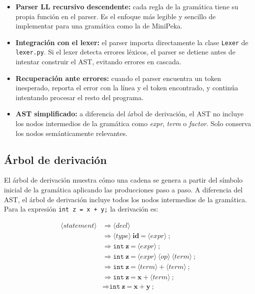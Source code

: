 \documentclass[12pt]{article}
\begin{document}
\begin{itemize}
    \item \textbf{Parser LL recursivo descendente:} cada regla de la
          gramática tiene su propia función en el parser. Es el enfoque
          más legible y sencillo de implementar para una gramática como
          la de MiniPeka.

    \item \textbf{Integración con el lexer:} el parser importa directamente
          la clase \texttt{Lexer} de \texttt{lexer.py}. Si el lexer detecta
          errores léxicos, el parser se detiene antes de intentar construir
          el AST, evitando errores en cascada.

    \item \textbf{Recuperación ante errores:} cuando el parser encuentra
          un token inesperado, reporta el error con la línea y el token
          encontrado, y continúa intentando procesar el resto del programa.

    \item \textbf{AST simplificado:} a diferencia del árbol de derivación,
          el AST no incluye los nodos intermedios de la gramática como
          \textit{expr}, \textit{term} o \textit{factor}. Solo conserva
          los nodos semánticamente relevantes.
\end{itemize}

\subsection{Árbol de derivación}

El árbol de derivación muestra cómo una cadena se genera a partir del
símbolo inicial de la gramática aplicando las producciones paso a paso.
A diferencia del AST, el árbol de derivación incluye todos los nodos
intermedios de la gramática. Para la expresión \texttt{int z = x + y;}
la derivación es:

\shorthandoff{<>}
\begin{align*}
\langle statement \rangle
    &\Rightarrow \langle decl \rangle \\
    &\Rightarrow \langle type \rangle\ \textbf{id}\ \texttt{=}
                 \ \langle expr \rangle\ \texttt{;} \\
    &\Rightarrow \texttt{int}\ \textbf{z}\ \texttt{=}
                 \ \langle expr \rangle\ \texttt{;} \\
    &\Rightarrow \texttt{int}\ \textbf{z}\ \texttt{=}
                 \ \langle expr \rangle\ \langle op \rangle
                 \ \langle term \rangle\ \texttt{;} \\
    &\Rightarrow \texttt{int}\ \textbf{z}\ \texttt{=}
                 \ \langle term \rangle\ \texttt{+}
                 \ \langle term \rangle\ \texttt{;} \\
    &\Rightarrow \texttt{int}\ \textbf{z}\ \texttt{=}
                 \ \textbf{x}\ \texttt{+}\ \langle term \rangle\ \texttt{;} \\
    &\Rightarrow \texttt{int}\ \textbf{z}\ \texttt{=}
                 \ \textbf{x}\ \texttt{+}\ \textbf{y}\ \texttt{;}
\end{align*}
\shorthandon{<>}
\end{document}
